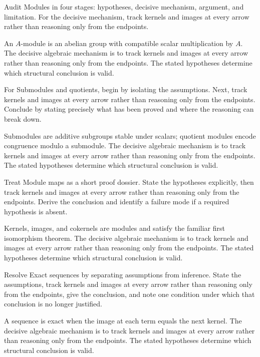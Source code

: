\begin{problem}\label{prob:v09-problem-01}
Audit Modules in four stages: hypotheses, decisive mechanism, argument, and limitation. For the decisive mechanism, track kernels and images at every arrow rather than reasoning only from the endpoints.
\end{problem}
\begin{solution}
An $A$-module is an abelian group with compatible scalar multiplication by $A$. The decisive algebraic mechanism is to track kernels and images at every arrow rather than reasoning only from the endpoints. The stated hypotheses determine which structural conclusion is valid.
\end{solution}

\begin{problem}\label{prob:v09-problem-02}
For Submodules and quotients, begin by isolating the assumptions. Next, track kernels and images at every arrow rather than reasoning only from the endpoints. Conclude by stating precisely what has been proved and where the reasoning can break down.
\end{problem}
\begin{solution}
Submodules are additive subgroups stable under scalars; quotient modules encode congruence modulo a submodule. The decisive algebraic mechanism is to track kernels and images at every arrow rather than reasoning only from the endpoints. The stated hypotheses determine which structural conclusion is valid.
\end{solution}

\begin{problem}\label{prob:v09-problem-03}
Treat Module maps as a short proof dossier. State the hypotheses explicitly, then track kernels and images at every arrow rather than reasoning only from the endpoints. Derive the conclusion and identify a failure mode if a required hypothesis is absent.
\end{problem}
\begin{solution}
Kernels, images, and cokernels are modules and satisfy the familiar first isomorphism theorem. The decisive algebraic mechanism is to track kernels and images at every arrow rather than reasoning only from the endpoints. The stated hypotheses determine which structural conclusion is valid.
\end{solution}

\begin{problem}\label{prob:v09-problem-04}
Resolve Exact sequences by separating assumptions from inference. State the assumptions, track kernels and images at every arrow rather than reasoning only from the endpoints, give the conclusion, and note one condition under which that conclusion is no longer justified.
\end{problem}
\begin{solution}
A sequence is exact when the image at each term equals the next kernel. The decisive algebraic mechanism is to track kernels and images at every arrow rather than reasoning only from the endpoints. The stated hypotheses determine which structural conclusion is valid.
\end{solution}


